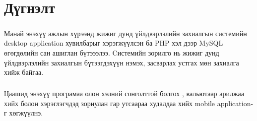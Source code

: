 \chapter{Дүгнэлт}
\label{chap:intro}
\paragraph{}
Манай энэхүү ажлын хүрээнд жижиг дунд үйлдвэрлэлийн захиалгын системийн desktop application хувилбарыг хэрэгжүүлсэн ба PHP хэл дээр MySQL өгөгдөлийн сан ашиглан бүтэээлээ. Cистемийн зорилго нь жижиг дунд үйлдвэрлэлийн захиалгын бүтээгдэхүүн нэмэх, засварлах устгах мөн  захиалга хийж байгаа.

\paragraph{} 
Цаашид энэхүү програмаа олон хэлний сонголттой болгох , вальютаар арилжаа хийх болон хэрэглэгчдэд зориулан гар утсаараа худалдаа хийх mobile application-г хөгжүүлнэ.
 